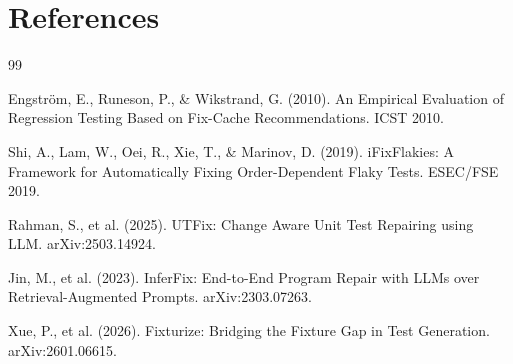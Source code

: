 \documentclass[12pt,a4paper]{article}
\begin{document}
\section{References}

\begin{thebibliography}{99}

\item Engström, E., Runeson, P., \& Wikstrand, G. (2010). An Empirical Evaluation of Regression Testing Based on Fix-Cache Recommendations. ICST 2010.

\item Shi, A., Lam, W., Oei, R., Xie, T., \& Marinov, D. (2019). iFixFlakies: A Framework for Automatically Fixing Order-Dependent Flaky Tests. ESEC/FSE 2019.

\item Rahman, S., et al. (2025). UTFix: Change Aware Unit Test Repairing using LLM. arXiv:2503.14924.

\item Jin, M., et al. (2023). InferFix: End-to-End Program Repair with LLMs over Retrieval-Augmented Prompts. arXiv:2303.07263.

\item Xue, P., et al. (2026). Fixturize: Bridging the Fixture Gap in Test Generation. arXiv:2601.06615.

\end{thebibliography}
\end{document}
